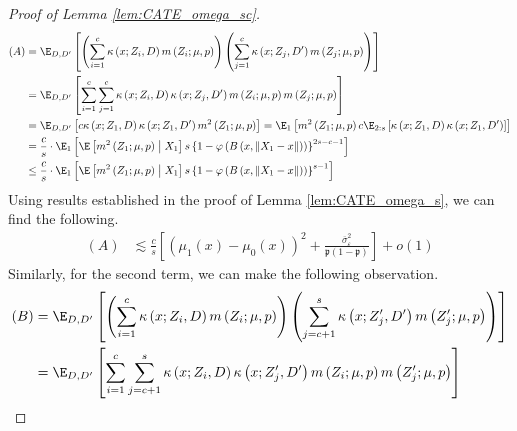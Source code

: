 \begin{proof}[Proof of Lemma \ref{lem:CATE_omega_sc}]
\begin{equation}
\begin{aligned}
            (A)
            & = \E_{D, D^{\prime}}\left[\left(\sum_{i = 1}^{c} \kappa\left(x; Z_{i}, D\right) m\left(Z_{i}; \mu, p\right)\right)
            \left(\sum_{j = 1}^{c} \kappa\left(x; Z_{j}, D^{\prime}\right) m\left(Z_{j}; \mu, p\right)\right)\right] \\
			& = \E_{D, D^{\prime}}\left[
				\sum_{i = 1}^{c} \sum_{j = 1}^{c} \kappa\left(x; Z_{i}, D\right)\kappa\left(x; Z_{j}, D^{\prime}\right) m\left(Z_{i}; \mu, p\right)m\left(Z_{j}; \mu, p\right)
			\right] \\
			& = \E_{D,D^{\prime}}\left[c \kappa\left(x; Z_{1}, D\right)\kappa\left(x; Z_{1}, D^{\prime}\right)m^{2}\left(Z_{1}; \mu, p\right)\right]
			= \E_{1}\left[m^{2}\left(Z_{1}; \mu, p\right) c \E_{2:s}\left[\kappa\left(x; Z_{1}, D\right)\kappa\left(x; Z_{1}, D^{\prime}\right)\right]\right]\\
			& = \frac{c}{s} \cdot \E_{1}\left[\E\left[m^{2}\left(Z_{1}; \mu, p\right) \; \middle| \; X_1\right] s \left\{1 - \varphi\left(B\left(x, \|X_1 - x\|\right)\right)\right\}^{2s - c- 1}\right]\\
			& \leq \frac{c}{s} \cdot \E_{1}\left[\E\left[m^{2}\left(Z_{1}; \mu, p\right) \; \middle| \; X_1\right] s \left\{1 - \varphi\left(B\left(x, \|X_1 - x\|\right)\right)\right\}^{s - 1}\right]
        \end{aligned}
    \end{equation}
	Using results established in the proof of Lemma \ref{lem:CATE_omega_s}, we can find the following.
	\begin{equation}
		\begin{aligned}
			(A) 
			& \lesssim \frac{c}{s} \left[\left(\mu_{1}\left(x\right) - \mu_{0}\left(x\right)\right)^2 + \frac{\overline{\sigma}^2_{\varepsilon}}{\mathfrak{p}\left(1 - \mathfrak{p}\right)}\right]  + o(1)
		\end{aligned}
	\end{equation}
	Similarly, for the second term, we can make the following observation.
	\begin{equation}
		\begin{aligned}
			(B) 
			& = \E_{D, D^{\prime}}\left[\left(\sum_{i = 1}^{c} \kappa\left(x; Z_{i}, D\right) m\left(Z_{i}; \mu, p\right)\right)
            \left(\sum_{j = c + 1}^{s} \kappa\left(x; Z_{j}^{\prime}, D^{\prime}\right) m\left(Z_{j}^{\prime}; \mu, p\right)\right)\right] \\
			& = \E_{D,D^{\prime}}\left[\sum_{i = 1}^{c} \sum_{j = c + 1}^{s}\kappa\left(x; Z_{i}, D\right)\kappa\left(x; Z_{j}^{\prime}, D^{\prime}\right) m\left(Z_{i}; \mu, p\right)m\left(Z_{j}^{\prime}; \mu, p\right)\right]\\

\end{aligned}
\end{equation}
\end{proof}
